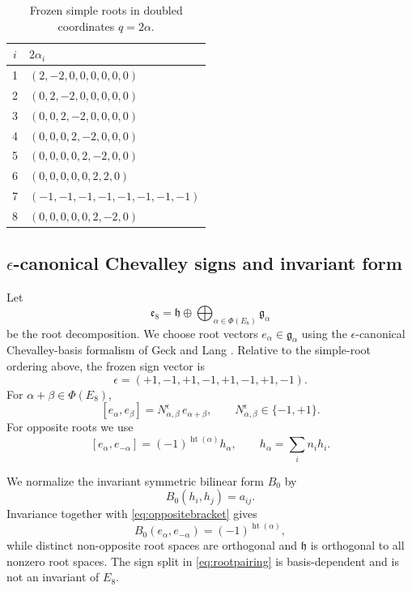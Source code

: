 \documentclass[11pt]{article}
\theoremstyle{definition}
\theoremstyle{remark}
\newcommand{\e}{\mathfrak e}
\newcommand{\h}{\mathfrak h}
\newcommand{\PhiE}{\Phi(E_8)}
\begin{document}
\begin{table}[ht]
\centering
\small
\caption{Frozen simple roots in doubled coordinates $q=2\alpha$.}
\label{tab:simpleroots}
\begin{tabular}{c@{\qquad}l}
\toprule
$i$ & $2\alpha_i$\\
\midrule
1 & $(2,-2,0,0,0,0,0,0)$\\
2 & $(0,2,-2,0,0,0,0,0)$\\
3 & $(0,0,2,-2,0,0,0,0)$\\
4 & $(0,0,0,2,-2,0,0,0)$\\
5 & $(0,0,0,0,2,-2,0,0)$\\
6 & $(0,0,0,0,0,2,2,0)$\\
7 & $(-1,-1,-1,-1,-1,-1,-1,-1)$\\
8 & $(0,0,0,0,0,2,-2,0)$\\
\bottomrule
\end{tabular}
\end{table}

\subsection{\texorpdfstring{$\epsilon$-canonical}{epsilon-canonical} Chevalley signs and invariant form}

Let
\[
\e_8=\h\oplus\bigoplus_{\alpha\in\PhiE}\mathfrak g_\alpha
\]
be the root decomposition.  We choose root vectors $e_\alpha\in\mathfrak g_\alpha$ using the $\epsilon$-canonical Chevalley-basis formalism of Geck and Lang \cite{GeckLang2025}.  Relative to the simple-root ordering above, the frozen sign vector is
\begin{equation}\label{eq:epsilon}
\epsilon=(+1,-1,+1,-1,+1,-1,+1,-1).
\end{equation}
For $\alpha+\beta\in\PhiE$,
\[
[e_\alpha,e_\beta]=N_{\alpha,\beta}^{\epsilon}\,e_{\alpha+\beta},
\qquad N_{\alpha,\beta}^{\epsilon}\in\{-1,+1\}.
\]
For opposite roots we use
\begin{equation}\label{eq:oppositebracket}
[e_\alpha,e_{-\alpha}]
=(-1)^{\operatorname{ht}(\alpha)}h_\alpha,
\qquad
h_\alpha=\sum_i n_i h_i.
\end{equation}

We normalize the invariant symmetric bilinear form $B_0$ by
\begin{equation}\label{eq:B0cartan}
B_0(h_i,h_j)=a_{ij}.
\end{equation}
Invariance together with \eqref{eq:oppositebracket} gives
\begin{equation}\label{eq:rootpairing}
B_0(e_\alpha,e_{-\alpha})=(-1)^{\operatorname{ht}(\alpha)},
\end{equation}
while distinct non-opposite root spaces are orthogonal and $\h$ is orthogonal to all nonzero root spaces.  The sign split in \eqref{eq:rootpairing} is basis-dependent and is not an invariant of $E_8$.
\end{document}
